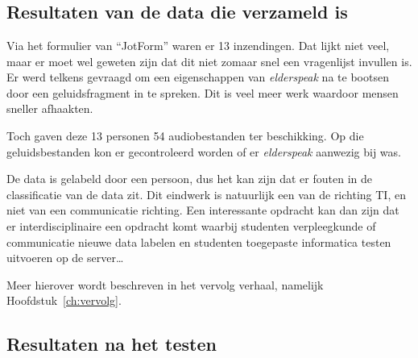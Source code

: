 
\chapter{}
\label{ch:resultaten}

\section{Resultaten van de data die verzameld is}
Via het formulier van ``JotForm'' waren er 13 inzendingen. Dat lijkt niet veel, maar er moet wel geweten zijn dat dit niet zomaar snel een vragenlijst invullen is. Er werd telkens gevraagd om een eigenschappen van \textit{elderspeak} na te bootsen door een geluidsfragment in te spreken. Dit is veel meer werk waardoor mensen sneller afhaakten.

Toch gaven deze 13 personen 54 audiobestanden ter beschikking. Op die geluidsbestanden kon er gecontroleerd worden of er \textit{elderspeak} aanwezig bij was.

De data is gelabeld door een persoon, dus het kan zijn dat er fouten in de classificatie van de data zit. Dit eindwerk is natuurlijk een van de richting TI, en niet van een communicatie richting. Een interessante opdracht kan dan zijn dat er interdisciplinaire een opdracht komt waarbij studenten verpleegkunde of communicatie nieuwe data labelen en studenten toegepaste informatica testen uitvoeren op de server\ldots

Meer hierover wordt beschreven in het vervolg verhaal, namelijk Hoofdstuk~\ref{ch:vervolg}.

\section{Resultaten na het testen}
